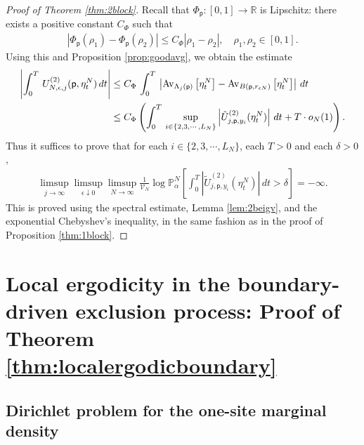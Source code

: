 \documentclass[11pt]{amsart}
\theoremstyle{plain}
\theoremstyle{definition}
\theoremstyle{remark}
\begin{document}
\begin{proof}[Proof of Theorem \ref{thm:2block}]
Recall that $\Phi_{\mathsf{p}}: [0,1] \to \mathbb{R}$ is Lipschitz: there exists a positive constant $C_\Phi$ such that
\begin{align*}
\left|\Phi_{\mathsf{p}}(\rho_1)- \Phi_{\mathsf{p}}(\rho_2)\right| \leq C_\Phi |\rho_1-\rho_2|, \quad \rho_1,\rho_2 \in [0,1].
\end{align*}
Using this and Proposition \ref{prop:goodavg}, we obtain the estimate
\begin{align*}
\left|\int_0^T \, {U^{(2)}_{{{N}},{{\epsilon}},{{j}}}}({\mathsf{p}},\eta^N_t)\,dt\right|
& \leq  C_\Phi \,\int_0^T \,\left| {{\rm Av}_{{\Lambda_j({\mathsf{p}})}}\left[{{\eta^N_t}}\right]} - {{\rm Av}_{{B({\mathsf{p}}, r_{\epsilon N})}}\left[{{\eta^N_t}}\right]}\right| \,dt\\
&\leq C_\Phi \left(\int_0^T \, \sup_{i\in \{2,3,\cdots, L_N\}}  \left|{\tilde{U}^{(2)}_{{{j}},{{\mathsf{p}}},{{y_i}}}}(\eta_t^N)\right|\,dt+T \cdot o_N(1)\right).
\end{align*}
Thus it suffices to prove that for each $i\in \{2,3,\cdots, L_N\}$, each $T>0$ and each $\delta>0$,
\begin{align*}
\limsup_{j\to\infty} \limsup_{\epsilon\downarrow 0} \limsup_{N\to\infty} \frac{1}{\mathcal{V}_N}\log \mathbb{P}^N_\alpha\left[\int_0^T \left|{\tilde{U}^{(2)}_{{{j}},{{\mathsf{p}}},{{y_i}}}}(\eta^N_t) \right| \,dt>\delta\right] = -\infty.
\end{align*}
This is proved using the spectral estimate, Lemma \ref{lem:2beigv}, and the exponential Chebyshev's inequality, in the same fashion as in the proof of Proposition \ref{thm:1block}.
\end{proof}

\section{Local ergodicity in the boundary-driven exclusion process: Proof of Theorem \ref{thm:localergodicboundary}} \label{sec:boundary}

\subsection{Dirichlet problem for the one-site marginal density} \label{sec:dirichlet}
\end{document}

